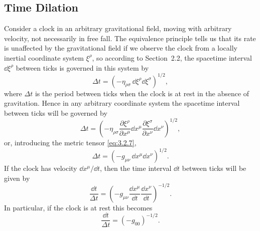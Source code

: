
\subsection{Time Dilation}\label{sec:3.5}

Consider a clock in an arbitrary gravitational field, moving with arbitrary
velocity, not necessarily in free fall. The equivalence principle tells us
that its rate is unaffected by the gravitational field if we observe the
clock from a locally inertial coordinate system $\xi^\rho$, so according to
Section~2.2, the spacetime interval $\dd\xi^\rho$ between ticks is governed
in this system by
\[
  \Delta t=
  \left(-\eta_{\rho\sigma}\,\dd\xi^\rho\dd\xi^\sigma\right)^{1/2},
\]
where $\Delta t$ is the period between ticks when the clock is at rest in the
absence of gravitation. Hence in any arbitrary coordinate system the
spacetime interval between ticks will be governed by
\[
  \Delta t=
  \left(
  -\eta_{\rho\sigma}
  \frac{\partial\xi^\rho}{\partial x^\mu}\dd x^\mu
  \frac{\partial\xi^\sigma}{\partial x^\nu}\dd x^\nu
  \right)^{1/2},
\]
or, introducing the metric tensor \eqref{eq:3.2.7},
\[
  \Delta t=\left(-g_{\mu\nu}\,\dd x^\mu\dd x^\nu\right)^{1/2}.
\]
If the clock has velocity $\dd x^\mu/\dd t$, then the time interval $\dd t$
between ticks will be given by
\begin{equation}
  \frac{\dd t}{\Delta t}
  =
  \left(
  -g_{\mu\nu}
  \frac{\dd x^\mu}{\dd t}\frac{\dd x^\nu}{\dd t}
  \right)^{-1/2}.
  \tag{3.5.1}\label{eq:3.5.1}
\end{equation}
In particular, if the clock is at rest this becomes
\begin{equation}
  \frac{\dd t}{\Delta t}=(-g_{00})^{-1/2}.
  \tag{3.5.2}\label{eq:3.5.2}
\end{equation}

